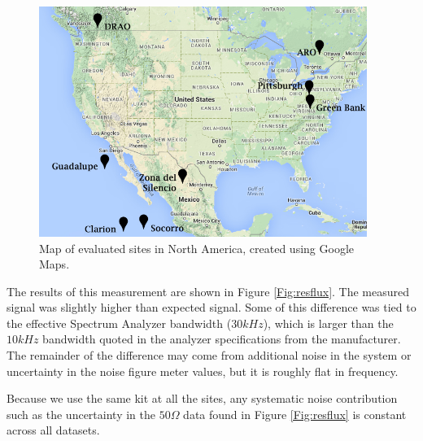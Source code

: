 \begin{figure}[tb]
\begin{center}
\includegraphics[width=0.95\textwidth]{RFI_testing/figures/large_scale_site_map.jpg}
\caption{Map of evaluated sites in North America, created using Google Maps.}
\label{Fig:site_map}
\end{center}
\end{figure}

The results of this measurement are shown in Figure \ref{Fig:resflux}. The measured signal was slightly higher than expected signal. Some of this difference was tied to the effective Spectrum Analyzer bandwidth ($30 kHz$), which is larger than the $10 kHz$ bandwidth quoted in the analyzer specifications from the manufacturer. The remainder of the difference may come from additional noise in the system or uncertainty in the noise figure meter values, but it is roughly flat in frequency. 

Because we use the same kit at all the sites, any systematic noise contribution such as the uncertainty in the $50 \Omega$ data found in Figure \ref{Fig:resflux} is constant across all datasets. 

